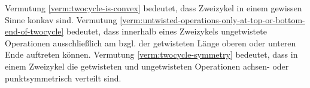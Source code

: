 \begin{anm}
	Vermutung \ref{verm:twocycle-is-convex} bedeutet, dass Zweizykel in einem
	gewissen Sinne konkav sind. Vermutung
	\ref{verm:untwisted-operations-only-at-top-or-bottom-end-of-twocycle} bedeutet,
	dass innerhalb eines Zweizykels ungetwistete Operationen ausschließlich am
	bzgl. der getwisteten Länge oberen oder unteren Ende auftreten können.
	Vermutung \ref{verm:twocycle-symmetry} bedeutet, dass in einem Zweizykel die
	getwisteten und ungetwisteten Operationen achsen- oder punktsymmetrisch verteilt sind.
\end{anm}